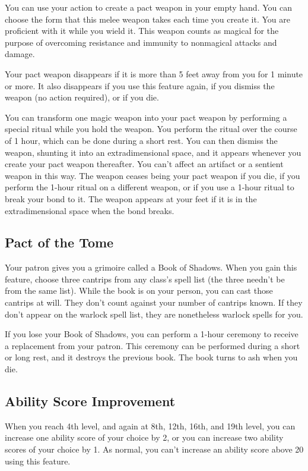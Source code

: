 You can use your action to create a pact weapon in your empty hand. You can choose the form that this melee weapon takes each time you create it. You are proficient with it while you wield it. This weapon counts as magical for the purpose of overcoming resistance and immunity to nonmagical attacks and damage.

Your pact weapon disappears if it is more than 5 feet away from you for 1 minute or more. It also disappears if you use this feature again, if you dismiss the weapon (no action required), or if you die.

You can transform one magic weapon into your pact weapon by performing a special ritual while you hold the weapon. You perform the ritual over the course of 1 hour, which can be done during a short rest. You can then dismiss the weapon, shunting it into an extradimensional space, and it appears whenever you create your pact weapon thereafter. You can't affect an artifact or a sentient weapon in this way. The weapon ceases being your pact weapon if you die, if you perform the 1-hour ritual on a different weapon, or if you use a 1-hour ritual to break your bond to it. The weapon appears at your feet if it is in the extradimensional space when the bond breaks.

\subsection{Pact of the Tome}

Your patron gives you a grimoire called a Book of Shadows. When you gain this feature, choose three cantrips from any class's spell list (the three needn't be from the same list). While the book is on your person, you can cast those cantrips at will. They don't count against your number of cantrips known. If they don't appear on the warlock spell list, they are nonetheless warlock spells for you.

If you lose your Book of Shadows, you can perform a 1-hour ceremony to receive a replacement from your patron. This ceremony can be performed during a short or long rest, and it destroys the previous book. The book turns to ash when you die.

\subsection{Ability Score Improvement}

When you reach 4th level, and again at 8th, 12th, 16th, and 19th level, you can increase one ability score of your choice by 2, or you can increase two ability scores of your choice by 1. As normal, you can't increase an ability score above 20 using this feature.

